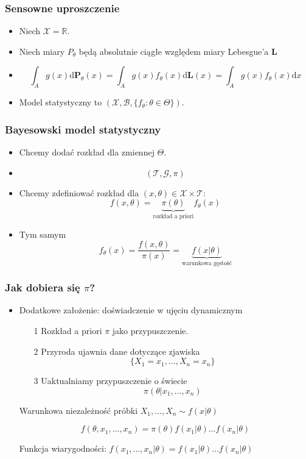 \documentclass[draft, xetex]{beamer}
\begin{document}
\begin{frame}
	
	\frametitle{Sensowne uproszczenie}

	\begin{itemize}
		\item Niech $\mathcal{X} = \mathbb{R}$.
		\item Niech miary $P_{\theta}$ będą absolutnie ciągłe względem miary Lebesgue'a $\mathbf{L}$
		\item $$ \int_A g(x) \mathrm{d} \mathbf{P}_\theta (x) = \int_A g(x) f_{\theta} (x) \mathrm{d} \mathbf{L}(x) = \int_A g(x) f_\theta (x) \mathrm{d} x $$		
		\item Model statystyczny to $( \mathcal{X}, \mathcal{B}, \{ f_\theta  : \theta \in \Theta\} )$.
	\end{itemize}
	
	
	
\end{frame}

\begin{frame}
	\frametitle{Bayesowski model statystyczny}
	\begin{itemize}
		\item Chcemy dodać rozkład dla zmiennej $\Theta$.
		\item $$  (\mathcal{T}, \mathcal{G}, \pi) $$
		\item Chcemy zdefiniować rozkład dla $(x, \theta) \in \mathcal{X} \times \mathcal{T}$:
                $$f(x, \theta) = \underbrace{\pi (\theta)}_{\text{rozkład a priori}} f_\theta (x)$$
        \item Tym samym $$f_\theta (x) = \frac{f(x, \theta)}{\pi (x)} = \underbrace{f(x | \theta)}_{\text{warunkowa gęstość}}$$
	\end{itemize}
\end{frame}

\begin{frame}
	\frametitle{Jak dobiera się $\pi$?}
	
	\begin{itemize}
			\item Dodatkowe założenie: doświadczenie w ujęciu dynamicznym
			
			\begin{itemize}
				\item[1] Rozkład a priori $\pi$ jako przypuszczenie.
				\item[2] Przyroda ujawnia dane dotyczące zjawiska $$\{ X_1 = x_1, \dots , X_n = x_n \}$$		
				\item[3] Uaktualniamy przypuszczenie o świecie $$\pi(\theta | x_1, \dots, x_n)$$ 
 			\end{itemize}

			\item[] Warunkowa niezależność próbki $ X_1 ,\dots, X_n \sim f(x | \theta) $
			\item[] $$ f(\theta, x_1, \dots, x_n) = \pi(\theta) f(x_1 | \theta) \dots f(x_n | \theta)$$
			\item[] Funkcja wiarygodności: $f(x_1, \dots, x_n | \theta) = f(x_1 | \theta) \dots f(x_n | \theta) $
	\end{itemize}
\end{frame}
\end{document}
